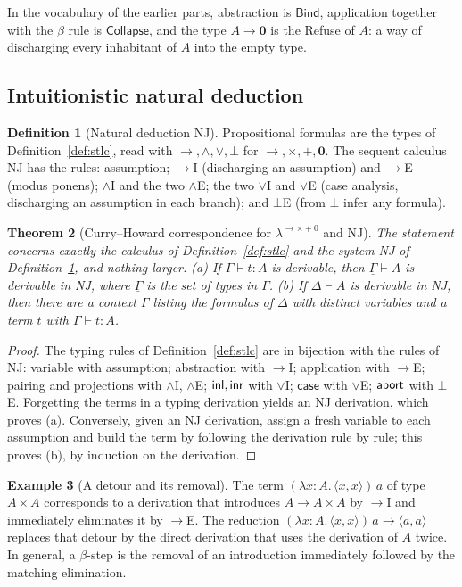 \documentclass[11pt]{article}
\newcommand{\Bind}{\mathsf{Bind}}
\newcommand{\Coll}{\mathsf{Collapse}}
\theoremstyle{definition}
\newtheorem{definition}{Definition}[section]
\newtheorem{example}[definition]{Example}
\theoremstyle{plain}
\newtheorem{theorem}[definition]{Theorem}
\theoremstyle{remark}
\begin{document}
In the vocabulary of the earlier parts, abstraction is $\Bind$, application together with the $\beta$ rule is $\Coll$, and the type $A\to\mathbf 0$ is the Refuse of $A$: a way of discharging every inhabitant of $A$ into the empty type.

\subsection{Intuitionistic natural deduction}

\begin{definition}[Natural deduction NJ]\label{def:nj}
Propositional formulas are the types of Definition~\ref{def:stlc}, read with $\to,\wedge,\vee,\bot$ for $\to,\times,+,\mathbf 0$. The sequent calculus NJ has the rules: assumption; $\to$I (discharging an assumption) and $\to$E (modus ponens); $\wedge$I and the two $\wedge$E; the two $\vee$I and $\vee$E (case analysis, discharging an assumption in each branch); and $\bot$E (from $\bot$ infer any formula).
\end{definition}

\begin{theorem}[Curry--Howard correspondence for $\lambda^{\to\times+0}$ and NJ]\label{thm:ch}
The statement concerns exactly the calculus of Definition~\ref{def:stlc} and the system NJ of Definition~\ref{def:nj}, and nothing larger.
(a) If $\Gamma\vdash t:A$ is derivable, then $\underline\Gamma\vdash A$ is derivable in NJ, where $\underline\Gamma$ is the set of types in $\Gamma$.
(b) If $\Delta\vdash A$ is derivable in NJ, then there are a context $\Gamma$ listing the formulas of $\Delta$ with distinct variables and a term $t$ with $\Gamma\vdash t:A$.
\end{theorem}
\begin{proof}
The typing rules of Definition~\ref{def:stlc} are in bijection with the rules of NJ: variable with assumption; abstraction with $\to$I; application with $\to$E; pairing and projections with $\wedge$I, $\wedge$E; $\mathsf{inl},\mathsf{inr}$ with $\vee$I; $\mathsf{case}$ with $\vee$E; $\mathsf{abort}$ with $\bot$E. Forgetting the terms in a typing derivation yields an NJ derivation, which proves (a). Conversely, given an NJ derivation, assign a fresh variable to each assumption and build the term by following the derivation rule by rule; this proves (b), by induction on the derivation.
\end{proof}

\begin{example}[A detour and its removal]\label{ex:detour}
The term $(\lambda x{:}A.\,\langle x,x\rangle)\,a$ of type $A\times A$ corresponds to a derivation that introduces $A\to A\times A$ by $\to$I and immediately eliminates it by $\to$E. The reduction $(\lambda x{:}A.\,\langle x,x\rangle)\,a\to\langle a,a\rangle$ replaces that detour by the direct derivation that uses the derivation of $A$ twice. In general, a $\beta$-step is the removal of an introduction immediately followed by the matching elimination.
\end{example}
\end{document}
